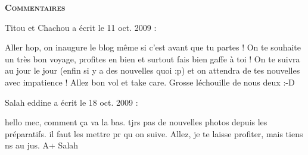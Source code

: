 \bigskip
\textbf{\textsc{Commentaires}}

 \medskip
Titou et Chachou a écrit le 11 oct. 2009 :
\begin{displayquote}
Aller hop, on inaugure le blog même si c'est avant que tu partes !
On te souhaite un très bon voyage, profites en bien et surtout fais bien gaffe à toi !
On te suivra au jour le jour (enfin si y a des nouvelles quoi :p) et on attendra de tes nouvelles avec impatience !
Allez bon vol et take care.
Grosse léchouille de nous deux :-D
\end{displayquote}

 \medskip
Salah eddine a écrit le 18 oct. 2009 :
\begin{displayquote}
hello mec,
comment ça va la bas. tjrs pas de nouvelles photos depuis les préparatifs. il faut les mettre pr qu on suive.
Allez, je te laisse profiter, mais tiens ns au jus.
A+
Salah
\end{displayquote}

